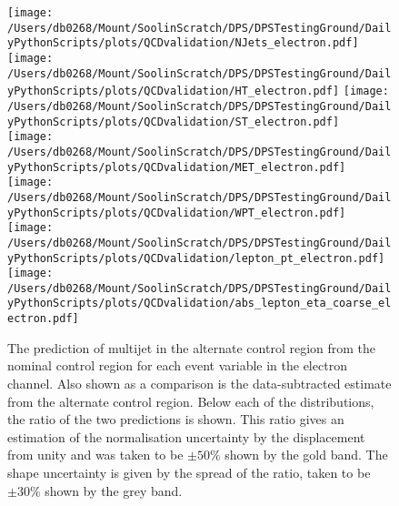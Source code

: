 \begin{figure}[p]
	\centering
	\texttt{[image: /Users/db0268/Mount/SoolinScratch/DPS/DPSTestingGround/DailyPythonScripts/plots/QCDvalidation/NJets\_electron.pdf]}
	\texttt{[image: /Users/db0268/Mount/SoolinScratch/DPS/DPSTestingGround/DailyPythonScripts/plots/QCDvalidation/HT\_electron.pdf]} 
	\texttt{[image: /Users/db0268/Mount/SoolinScratch/DPS/DPSTestingGround/DailyPythonScripts/plots/QCDvalidation/ST\_electron.pdf]} \\
	\texttt{[image: /Users/db0268/Mount/SoolinScratch/DPS/DPSTestingGround/DailyPythonScripts/plots/QCDvalidation/MET\_electron.pdf]} 
	\texttt{[image: /Users/db0268/Mount/SoolinScratch/DPS/DPSTestingGround/DailyPythonScripts/plots/QCDvalidation/WPT\_electron.pdf]} \\
	\texttt{[image: /Users/db0268/Mount/SoolinScratch/DPS/DPSTestingGround/DailyPythonScripts/plots/QCDvalidation/lepton\_pt\_electron.pdf]} 
	\texttt{[image: /Users/db0268/Mount/SoolinScratch/DPS/DPSTestingGround/DailyPythonScripts/plots/QCDvalidation/abs\_lepton\_eta\_coarse\_electron.pdf]}
	\caption[The prediction of multijet \QCD{} in the alternate control region from the nominal control region for each event variable in the electron channel. Also shown as a comparison is the data-subtracted \QCD{} estimate from the alternate control region. Below each of the distributions, the ratio of the two \QCD predictions is shown. This ratio gives an estimation of the \QCD{} normalisation uncertainty by the displacement from unity and was taken to be $\pm50\%$ shown by the gold band. The \QCD{} shape uncertainty is given by the spread of the ratio, taken to be $\pm30\%$ shown by the grey band.]{The prediction of multijet \QCD{} in the alternate control region from the nominal control region for each event variable in the electron channel. Also shown as a comparison is the data-subtracted \QCD{} estimate from the alternate control region. Below each of the distributions, the ratio of the two \QCD predictions is shown. This ratio gives an estimation of the \QCD{} normalisation uncertainty by the displacement from unity and was taken to be $\pm50\%$ shown by the gold band. The \QCD{} shape uncertainty is given by the spread of the ratio, taken to be $\pm30\%$ shown by the grey band.}
	\label{fig:QCDeValid}
\end{figure}

